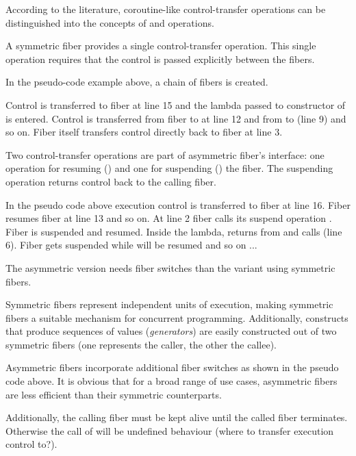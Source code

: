 
According to the literature\cite{Moura2009}, coroutine-like control-transfer
operations can be distinguished into the concepts of \sym and \asym
operations.

 A symmetric fiber provides a single
control-transfer operation. This single operation requires that the control is
passed explicitly between the fibers.


In the pseudo-code example above, a chain of fibers is created.

Control is transferred to fiber  at line 15 and the lambda
passed to constructor of  is entered. Control is transferred from
fiber  to  at line 12 and from  to  (line 9) and
so on. Fiber  itself transfers control directly back to
fiber  at line 3.

 Two control-transfer operations are part of
asymmetric fiber's interface: one operation for resuming (\resume) and one for
suspending () the fiber. The suspending operation returns
control back to the calling fiber.

In the pseudo code above execution control is transferred to fiber  at
line 16. Fiber  resumes fiber  at line 13 and so on. At line 2
fiber  calls its suspend operation . Fiber 
is suspended and  resumed. Inside the lambda,  returns from
 and calls  (line 6). Fiber  gets
suspended while  will be resumed and so on ...

The asymmetric version needs  fiber switches than the variant
using symmetric fibers.


Symmetric fibers represent independent units of execution, making symmetric
fibers a suitable mechanism for concurrent programming. Additionally,
constructs that produce sequences of values (\emph{generators}) are easily
constructed out of two symmetric fibers (one represents the caller, the other
the callee).

Asymmetric fibers incorporate additional fiber switches as shown in the pseudo
code above. It is obvious that for a broad range of use cases, asymmetric
fibers are less efficient than their symmetric counterparts.

Additionally, the calling fiber must be kept alive until the called fiber
terminates. Otherwise the call of  will be undefined behaviour
(where to transfer execution control to?).

